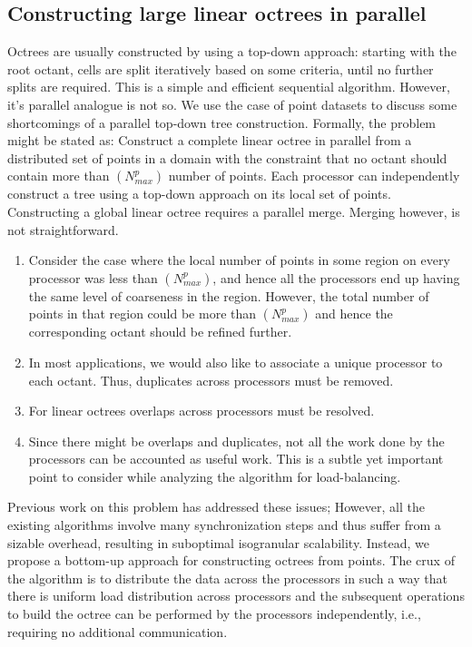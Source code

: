 \subsection{Constructing large linear octrees in parallel}
\label{sec:p2o}
Octrees are usually constructed by using a top-down approach: starting
with the root octant, cells are split iteratively based on some
criteria, until no further splits are required. This is a simple and
efficient sequential algorithm. However, it's parallel analogue is not
so. We use the case of point datasets to discuss some shortcomings of
a parallel top-down tree construction. Formally, the problem might be
stated as: Construct a complete linear octree in parallel from a
distributed set of points in a domain with the constraint that no
octant should contain more than $(N_{max}^p)$ number of points. Each
processor can independently construct a tree using a top-down approach
on its local set of points.  Constructing a global linear octree
requires a parallel merge. Merging however, is not straightforward.
\begin{enumerate}
\item Consider the case where the local number of points in some
region on every processor was less than $(N_{max}^p)$, and hence all
the processors end up having the same level of coarseness in the
region. However, the total number of points in that region could be
more than $(N_{max}^p)$ and hence the corresponding octant should be
refined further.
\item In most applications, we would also like to associate a unique
processor to each octant. Thus, duplicates across processors must be
removed.
\item For linear octrees overlaps across processors must be resolved.
\item Since there might be overlaps and duplicates, not all the work
done by the processors can be accounted as useful work. This is a
subtle yet important point to consider while analyzing the algorithm
for load-balancing.
\end{enumerate}
Previous work \cite{aluru02, tu05, warren93, ying03} on this problem
has addressed these issues; However, all the existing algorithms
involve many synchronization steps and thus suffer from a sizable
overhead, resulting in suboptimal isogranular scalability. Instead, we
propose a bottom-up approach for constructing octrees from points. The
crux of the algorithm is to distribute the data across the processors
in such a way that there is uniform load distribution across
processors and the subsequent operations to build the octree can be
performed by the processors independently, i.e., requiring no
additional communication.

